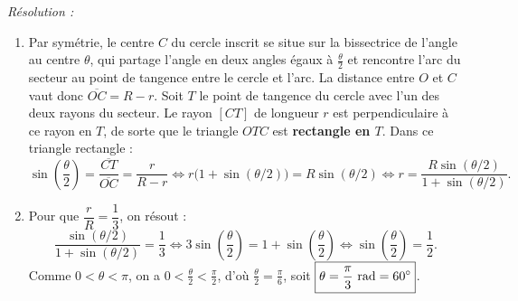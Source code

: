 \begin{exemple}
\emph{Résolution :}
\begin{enumerate}
    \item Par symétrie, le centre $C$ du cercle inscrit se situe sur la bissectrice de l'angle au centre $\theta$, qui partage l'angle en deux angles égaux à $\frac{\theta}{2}$ et rencontre l'arc du secteur au point de tangence entre le cercle et l'arc. La distance entre $O$ et $C$ vaut donc $\overline{OC} = R - r$.
    Soit $T$ le point de tangence du cercle avec l'un des deux rayons du secteur. Le rayon $[CT]$ de longueur $r$ est perpendiculaire à ce rayon en $T$, de sorte que le triangle $OTC$ est \textbf{rectangle en $T$}. Dans ce triangle rectangle :
    \[
        \sin\left(\frac{\theta}{2}\right) = \frac{\overline{CT}}{\overline{OC}} = \frac{r}{R - r} \iff r\bigl(1 + \sin(\theta/2)\bigr) = R\sin(\theta/2) \iff \boxed{r = \frac{R\sin(\theta/2)}{1 + \sin(\theta/2)}}.
    \]
    \item Pour que $\dfrac{r}{R} = \dfrac{1}{3}$, on résout :
    \[
        \frac{\sin(\theta/2)}{1 + \sin(\theta/2)} = \frac{1}{3} \iff 3\sin\left(\frac{\theta}{2}\right) = 1 + \sin\left(\frac{\theta}{2}\right) \iff \sin\left(\frac{\theta}{2}\right) = \frac{1}{2}.
    \]
    Comme $0 < \theta < \pi$, on a $0 < \frac{\theta}{2} < \frac{\pi}{2}$, d'où $\frac{\theta}{2} = \frac{\pi}{6}$, soit $\boxed{\theta = \frac{\pi}{3} \text{ rad} = 60\degree}$.
\end{enumerate}
\end{exemple}

